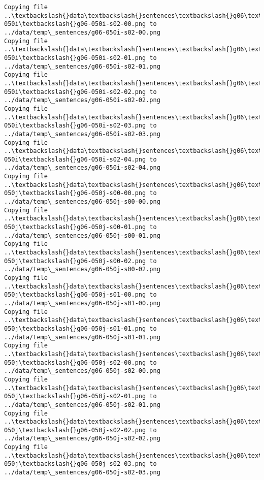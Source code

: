 \documentclass[11pt]{article}
\begin{document}
\begin{Verbatim}[commandchars=\\\{\}]
Copying file ..\textbackslash{}data\textbackslash{}sentences\textbackslash{}g06\textbackslash{}g06-050i\textbackslash{}g06-050i-s02-00.png to
../data/temp\_sentences/g06-050i-s02-00.png
Copying file ..\textbackslash{}data\textbackslash{}sentences\textbackslash{}g06\textbackslash{}g06-050i\textbackslash{}g06-050i-s02-01.png to
../data/temp\_sentences/g06-050i-s02-01.png
Copying file ..\textbackslash{}data\textbackslash{}sentences\textbackslash{}g06\textbackslash{}g06-050i\textbackslash{}g06-050i-s02-02.png to
../data/temp\_sentences/g06-050i-s02-02.png
Copying file ..\textbackslash{}data\textbackslash{}sentences\textbackslash{}g06\textbackslash{}g06-050i\textbackslash{}g06-050i-s02-03.png to
../data/temp\_sentences/g06-050i-s02-03.png
Copying file ..\textbackslash{}data\textbackslash{}sentences\textbackslash{}g06\textbackslash{}g06-050i\textbackslash{}g06-050i-s02-04.png to
../data/temp\_sentences/g06-050i-s02-04.png
Copying file ..\textbackslash{}data\textbackslash{}sentences\textbackslash{}g06\textbackslash{}g06-050j\textbackslash{}g06-050j-s00-00.png to
../data/temp\_sentences/g06-050j-s00-00.png
Copying file ..\textbackslash{}data\textbackslash{}sentences\textbackslash{}g06\textbackslash{}g06-050j\textbackslash{}g06-050j-s00-01.png to
../data/temp\_sentences/g06-050j-s00-01.png
Copying file ..\textbackslash{}data\textbackslash{}sentences\textbackslash{}g06\textbackslash{}g06-050j\textbackslash{}g06-050j-s00-02.png to
../data/temp\_sentences/g06-050j-s00-02.png
Copying file ..\textbackslash{}data\textbackslash{}sentences\textbackslash{}g06\textbackslash{}g06-050j\textbackslash{}g06-050j-s01-00.png to
../data/temp\_sentences/g06-050j-s01-00.png
Copying file ..\textbackslash{}data\textbackslash{}sentences\textbackslash{}g06\textbackslash{}g06-050j\textbackslash{}g06-050j-s01-01.png to
../data/temp\_sentences/g06-050j-s01-01.png
Copying file ..\textbackslash{}data\textbackslash{}sentences\textbackslash{}g06\textbackslash{}g06-050j\textbackslash{}g06-050j-s02-00.png to
../data/temp\_sentences/g06-050j-s02-00.png
Copying file ..\textbackslash{}data\textbackslash{}sentences\textbackslash{}g06\textbackslash{}g06-050j\textbackslash{}g06-050j-s02-01.png to
../data/temp\_sentences/g06-050j-s02-01.png
Copying file ..\textbackslash{}data\textbackslash{}sentences\textbackslash{}g06\textbackslash{}g06-050j\textbackslash{}g06-050j-s02-02.png to
../data/temp\_sentences/g06-050j-s02-02.png
Copying file ..\textbackslash{}data\textbackslash{}sentences\textbackslash{}g06\textbackslash{}g06-050j\textbackslash{}g06-050j-s02-03.png to
../data/temp\_sentences/g06-050j-s02-03.png

\end{Verbatim}
\end{document}
